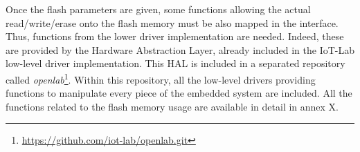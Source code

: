 
Once the flash parameters are given, some functions allowing the actual read/write/erase onto the flash memory must be also mapped in the interface.
Thus, functions from the lower driver implementation are needed.
Indeed, these are provided by the Hardware Abstraction Layer, already included in the IoT-Lab low-level driver implementation.
This HAL is included in a separated repository called \textit{openlab}\footnote{\url{https://github.com/iot-lab/openlab.git}}.
Within this repository, all the low-level drivers providing functions to manipulate every piece of the embedded system are included.
All the functions related to the flash memory usage are available in detail in annex X.
	
